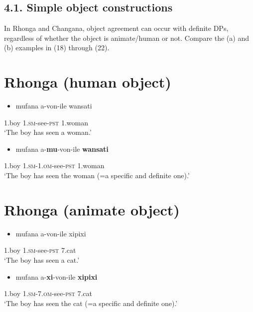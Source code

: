 \documentclass[output=paper]{langsci/langscibook}
\begin{document}
\section{4.1. Simple object constructions}

In Rhonga and Changana, object agreement can occur with definite DPs, regardless of whether the object is animate/human or not. Compare the (a) and (b) examples in (18) through (22).

\chapter[Rhonga (human object)]{Rhonga (human object)}
\label{bkm:Ref455885208}\setcounter{itemize}{0}
\begin{itemize}
\item \gll mufana         a-von-ile                  wansati\\
\end{itemize}
     1.boy           1.\textsc{sm}{}-see-\textsc{pst}            1.woman\\
\glt ‘The boy has seen a woman.’
\z

\begin{itemize}
\item \gll mufana    a-\textbf{mu}{}-von-ile             \textbf{wansati}\\
\end{itemize}
     1.boy     1\textsc{.sm-1.om}{}-see-\textsc{pst}     1.woman\\
\glt ‘The boy has seen the woman (=a specific and definite one).’
\z

\chapter[Rhonga (animate object)]{Rhonga (animate object)}
\setcounter{itemize}{0}
\begin{itemize}
\item \gll mufana       a-von-ile                    xipixi\\
\end{itemize}
     1.boy          1.\textsc{sm}{}-see-\textsc{pst }             7.cat\\
\glt ‘The boy has seen a cat.’
\z

\begin{itemize}
\item \gll mufana        a-\textbf{xi}{}-von-ile                   \textbf{xipixi}\\
\end{itemize}
     1.boy           \textsc{1.sm-7.om}{}-see-\textsc{pst}       7.cat\\
\glt ‘The boy has seen the cat (=a specific and definite one).’
\z
\end{document}
